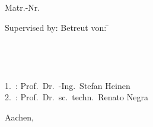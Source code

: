 \begin{titlepage}
{{\Large {} \\}~{\Large \IASAuthor\\}
{\Large Matr.-Nr. \IASMatNr\\} \bigskip \bigskip

\begin{tabbing}
{ \Large Supervised by:}
{ \Large Betreut von:} \= \Large \IASSupervisor \\
{ 	\> \Large \IASSupervisortwo \\   
}{ \> \\ }
 \> \\
 \> \\
\Large 1.~: \> \Large Prof.~Dr.~-Ing.~Stefan Heinen \\
\Large 2.~: \> \Large Prof.~Dr.~sc.~techn.~Renato Negra \\
\end{tabbing}


\centering{ \Large \IASNumber}
\begin{flushright}
	 {\Large Aachen, \IASSubmissionDate} \\~\\
\end{flushright}
\newpage

\setlength{\voffset}{0in}

\thispagestyle{empty}
\rule{0pt}{0pt}
\cleardoublepage

}%
\end{titlepage}

\hypersetup{pageanchor=true}
\cleardoublepage